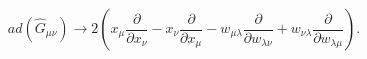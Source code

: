 \begin{equation}
ad\left(\hat{G}_{\mu\nu} \right)\rightarrow 2\left(
x_{\mu}\frac{\partial}{\partial x_{\nu}}
-x_{\nu}\frac{\partial}{\partial x_{\mu}}
-w_{\mu\lambda}\frac{\partial}{\partial w_{\lambda\nu}}
+w_{\nu\lambda}\frac{\partial}{\partial w_{\lambda\mu}}
\right).
\label{adjointGmunu}
\end{equation}


